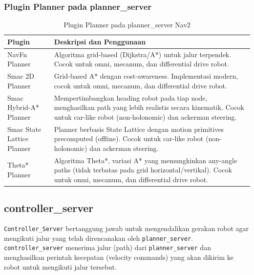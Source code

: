 \documentclass{article}
\begin{document}
\subsubsection*{Plugin Planner pada planner\_server}
\begin{table}[H]
  \centering
  \renewcommand{\arraystretch}{1.2}
  \begin{tabular}{|p{3cm}|p{8cm}|}
    \hline
    \textbf{Plugin}            & \textbf{Deskripsi dan Penggunaan}                                                                                                                                         \\
    \hline
    NavFn Planner              & Algoritma grid-based (Dijkstra/A*) untuk jalur terpendek. Cocok untuk omni, mecanum, dan differential drive robot.                                                        \\
    \hline
    Smac 2D Planner            & Grid-based A* dengan cost-awareness. Implementasi modern, cocok untuk omni, mecanum, dan differential drive robot.                                                        \\
    \hline
    Smac Hybrid-A* Planner     & Mempertimbangkan heading robot pada tiap node, menghasilkan path yang lebih realistis secara kinematik. Cocok untuk car-like robot (non-holonomic) dan ackerman steering. \\
    \hline
    Smac State Lattice Planner & Planner berbasis State Lattice dengan motion primitives precomputed (offline). Cocok untuk car-like robot (non-holonomic) dan ackerman steering.                          \\
    \hline
    Theta* Planner             & Algoritma Theta*, variasi A* yang memungkinkan any-angle paths (tidak terbatas pada grid horizontal/vertikal). Cocok untuk omni, mecanum, dan differential drive robot.   \\
    \hline
  \end{tabular}
  \caption{Plugin Planner pada planner\_server Nav2}
\end{table}

\subsection{controller\_server}
\texttt{Controller\_Server} bertanggung jawab untuk mengendalikan gerakan robot agar mengikuti jalur yang telah direncanakan oleh \texttt{planner\_server}. \texttt{controller\_server} menerima jalur (path) dari \texttt{planner\_server} dan menghasilkan perintah kecepatan (velocity commands) yang akan dikirim ke robot untuk mengikuti jalur tersebut.
\end{document}
